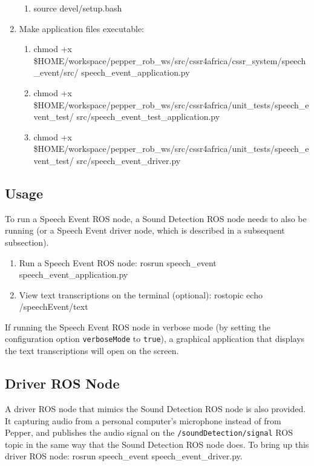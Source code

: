\documentclass{CSSRforAfrica}
\begin{document}
\begin{enumerate}
\begin{enumerate}
        \item source devel/setup.bash
    \end{enumerate}
    \item Make application files executable:
    \begin{enumerate}
        \item chmod +x \$HOME/workspace/pepper\_rob\_ws/src/cssr4africa/cssr\_system/speech\_event/src/ speech\_event\_application.py
        \item chmod +x \$HOME/workspace/pepper\_rob\_ws/src/cssr4africa/unit\_tests/speech\_event\_test/ src/speech\_event\_test\_application.py
        \item chmod +x \$HOME/workspace/pepper\_rob\_ws/src/cssr4africa/unit\_tests/speech\_event\_test/ src/speech\_event\_driver.py
    \end{enumerate}
\end{enumerate}

\subsection{Usage}
To run a Speech Event ROS node, a Sound Detection ROS node needs to also be running (or a Speech Event driver node, which is described in a subsequent subsection).

\begin{enumerate}
    \item Run a Speech Event ROS node: rosrun speech\_event speech\_event\_application.py
    \item View text transcriptions on the terminal (optional): rostopic echo /speechEvent/text
\end{enumerate}

If running the Speech Event ROS node in verbose mode (by setting the configuration option \texttt{verboseMode} to \texttt{true}), a graphical application that displays the text transcriptions will open on the screen.

\subsection{Driver ROS Node}
A driver ROS node that mimics the Sound Detection ROS node is also provided. It capturing audio from a personal computer's microphone instead of from Pepper, and publishes the audio signal on the \texttt{/soundDetection/signal} ROS topic in the same way that the Sound Detection ROS node does. To bring up this driver ROS node: rosrun speech\_event speech\_event\_driver.py.
\end{document}

